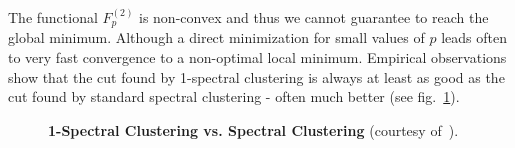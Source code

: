 The functional $F_p^{(2)}$ is non-convex and thus we cannot guarantee to reach the global minimum. Although a direct minimization for small values of $p$ leads often to very fast convergence to a non-optimal local minimum.
Empirical observations show that the cut found by 1-spectral clustering is always at least as good as the cut found by standard spectral clustering - often much better (see fig.~\ref{fig:1sc_sc_fig}).
\begin{figure}[htbp]
 \centering
\qquad
\qquad
{}
\qquad
 \caption[1-spectral clustering versus standard spectral clustering]{
  {\bf 1-Spectral Clustering vs. Spectral Clustering} (courtesy of~\cite{Setzer12}).}
\label{fig:1sc_sc_fig}
\end{figure}
\sloppy
  
